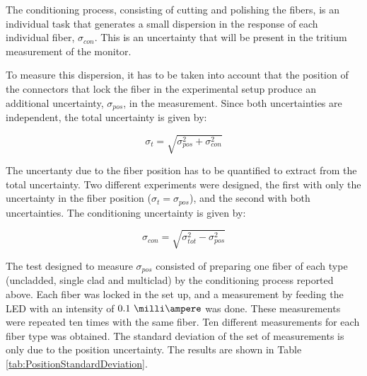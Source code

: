 The conditioning process, consisting of cutting and polishing the fibers, is an individual task that generates a small dispersion in the response of each individual fiber, $\sigma_{con}$. This is an uncertainty that will be present in the tritium measurement of the monitor.


To measure this dispersion, it has to be taken into account that the position of the connectors that lock the fiber in the experimental setup produce an additional uncertainty, $\sigma_{pos}$, in the measurement. Since both uncertainties are independent, the total uncertainty is given by:

\begin{equation}
\sigma_{t} = \sqrt{\sigma^2_{pos} + \sigma^2_{con} }
\label{eq:TotalUncertaintyFiberCharacterization}
\end{equation}

The uncertanty due to the fiber position has to be quantified to extract from the total uncertainty. Two different experiments were designed, the first with only the uncertainty in the fiber position ($\sigma_{t} = \sigma_{pos}$), and the second with both uncertainties. The conditioning uncertainty is given by:

\begin{equation}
\sigma_{con} = \sqrt{\sigma^2_{tot} - \sigma^2_{pos} }
\label{eq:ConditioningUncertaintyFiberCharacterization}
\end{equation}

The test designed to measure $\sigma_{pos}$ consisted of preparing one fiber of each type (uncladded, single clad and multiclad) by the conditioning process reported above. Each fiber was locked in the set up, and a measurement by feeding the LED with an intensity of $0.1~\milli\ampere$  was done. These measurements were repeated ten times with the same fiber. Ten different measurements for each fiber type was obtained. The standard deviation of the set of measurements is only due to the position uncertainty. The results are shown in Table \ref{tab:PositionStandardDeviation}.

